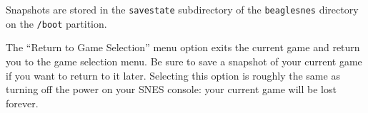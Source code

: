 \begin{updateWarn}
Snapshots are stored in the \texttt{savestate} subdirectory of the \texttt{beaglesnes} directory on the \texttt{/boot} partition.
\end{updateWarn}

The ``Return to Game Selection'' menu option exits the current game and return you to the game selection menu. Be sure to save a snapshot of your current game if you want to return to it later.  Selecting this option is roughly the same as turning off the power on your SNES console: your current game will be lost forever.
  